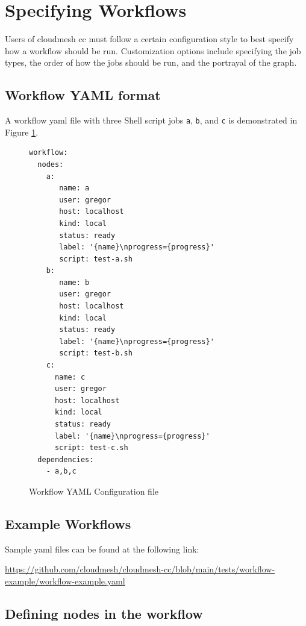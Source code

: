 
\section{Specifying Workflows}\label{specifying-workflows}

Users of cloudmesh cc must follow a certain configuration style to best
specify how a workflow should be run. Customization options include
specifying the job types, the order of how the jobs should be run, and
the portrayal of the graph.

\subsection{Workflow YAML format}\label{workflow-yaml-format}

A workflow yaml file with three Shell script jobs \texttt{a},
\texttt{b}, and \texttt{c} is demonstrated in Figure \ref{fig:yaml-file}.

\begin{figure}
\begin{verbatim}
workflow:
  nodes:
    a:
       name: a
       user: gregor
       host: localhost
       kind: local
       status: ready
       label: '{name}\nprogress={progress}'
       script: test-a.sh
    b:
       name: b
       user: gregor
       host: localhost
       kind: local
       status: ready
       label: '{name}\nprogress={progress}'
       script: test-b.sh
    c:
      name: c
      user: gregor
      host: localhost
      kind: local
      status: ready
      label: '{name}\nprogress={progress}'
      script: test-c.sh
  dependencies:
    - a,b,c
\end{verbatim}
\caption{Workflow YAML Configuration file}
\label{fig:yaml-file}
\end{figure}

\subsection{Example Workflows}\label{example-workflows}

Sample yaml files can be found at the following link:

\url{https://github.com/cloudmesh/cloudmesh-cc/blob/main/tests/workflow-example/workflow-example.yaml}

\subsection{Defining nodes in the
workflow}\label{defining-nodes-in-the-workflow}

